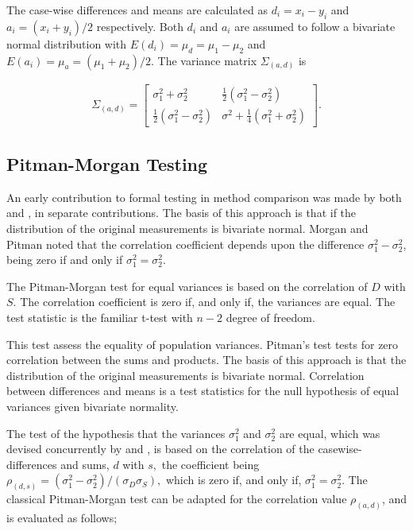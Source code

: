 \documentclass[12pt, a4paper]{report}
\theoremstyle{plain}
\theoremstyle{definition}
\theoremstyle{remark}
\begin{document}

The case-wise differences and means are calculated as $d_{i} =
x_{i}-y_{i}$ and $a_{i} = (x_{i}+y_{i})/2$  respectively. Both
$d_{i}$ and $a_{i}$ are assumed to follow a bivariate normal
distribution with $E(d_{i})= \mu_{d} = \mu_{1} - \mu_{2}$ and
$E(a_{i})= \mu_{a} = (\mu_{1} + \mu_{2})/2$. The variance matrix
$\Sigma_{(a,d)}$ is

\begin{eqnarray}
\Sigma_{(a,d)}= \left[\begin{matrix}
\sigma^{2}_{1}+\sigma^{2}_{2}&\frac{1}{2}(\sigma^{2}_{1}-\sigma^{2}_{2})\\
\frac{1}{2}(\sigma^{2}_{1}-\sigma^{2}_{2})&\sigma^{2}+
\frac{1}{4}(\sigma^{2}_{1}+\sigma^{2}_{2})
\end{matrix} \right].
\end{eqnarray}

\subsection{Pitman-Morgan Testing}
An early contribution to formal testing in method comparison was
made by both \citet{morgan} and \citet{pitman}, in separate
contributions. The basis of this approach is that if the
distribution of the original measurements is bivariate normal.
Morgan and Pitman noted that the correlation coefficient depends
upon the difference $\sigma^{2}_{1}- \sigma^{2}_{2}$, being zero
if and only if $\sigma^{2}_{1}=\sigma^{2}_{2}$.

The Pitman-Morgan test for equal variances is based on the correlation of $D$ with $S$. The correlation coefficient is zero if, and only if, the variances are equal. The test statistic is the familiar t-test with $n-2$ degree of freedom. 

This test assess the equality
of population variances. Pitman's test tests for zero correlation between the sums and products. The basis of this approach is that the distribution of the original measurements is bivariate normal.
Correlation between differences and means is a test statistics for
the null hypothesis of equal variances given bivariate normality.

The test of the hypothesis that the variances $\sigma^2_1$ and $\sigma^2_2$ are equal, which was devised concurrently by \citet{Pitman} and \citet{Morgan}, 
is based on the correlation of the casewise-differences and sums, $d$ with $s,$ the coefficient being $ \rho_{(d,s)} = (\sigma^2_1 -\sigma^2_2) / ( \sigma_D \sigma_S ),$ which is zero if, and only
if, $\sigma^2_1 = \sigma^2_2.$ The classical Pitman-Morgan test can be adapted for the correlation value $\rho_{(a,d)}$, and
is evaluated as follows;
\end{document}
